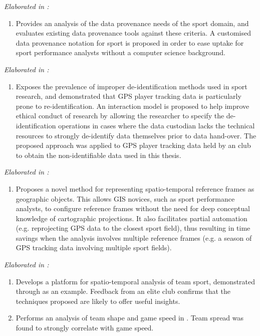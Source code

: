 \textit{Elaborated in :}
\begin{enumerate}
  \setcounter{enumi}{\value{contribnum}}
  \item Provides an analysis of the data provenance needs of the sport domain, and evaluates existing data provenance tools against these criteria. A customised data provenance notation for sport is proposed in order to ease uptake for sport performance analysts without a computer science background.
  \setcounter{contribnum}{\value{enumi}}
\end{enumerate}

\pagebreak{}

\textit{Elaborated in :}
\begin{enumerate}
  \setcounter{enumi}{\value{contribnum}}
  \item Exposes the prevalence of improper de-identification methods used in sport research, and demonstrated that GPS player tracking data is particularly prone to re-identification. An interaction model is proposed to help improve ethical conduct of research by allowing the researcher to specify the de-identification operations in cases where the data custodian lacks the technical resources to strongly de-identify data themselves prior to data hand-over. The proposed approach was applied to GPS player tracking data held by an \arf{} club to obtain the non-identifiable data used in this thesis.
  \setcounter{contribnum}{\value{enumi}}
\end{enumerate}

\textit{Elaborated in :}
\begin{enumerate}
  \setcounter{enumi}{\value{contribnum}}
  \item Proposes a novel method for representing spatio-temporal reference frames as geographic objects. This allows GIS novices, such as sport performance analysts, to configure reference frames without the need for deep conceptual knowledge of cartographic projections. It also facilitates partial automation (e.g. reprojecting GPS data to the closest sport field), thus resulting in time savings when the analysis involves multiple reference frames (e.g. a season of GPS tracking data involving multiple sport fields).
  \setcounter{contribnum}{\value{enumi}}
\end{enumerate}

\textit{Elaborated in :}
\begin{enumerate}
  \setcounter{enumi}{\value{contribnum}}
  \item Develops a platform for spatio-temporal analysis of team sport, demonstrated through \arf{} as an example. Feedback from an elite \arf{} club confirms that the techniques proposed are likely to offer useful insights.
  \item Performs an analysis of team shape and game speed in \arf{}. Team spread was found to strongly correlate with game speed.
  \setcounter{contribnum}{\value{enumi}}
\end{enumerate}

